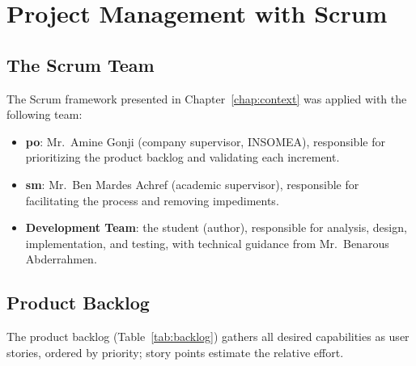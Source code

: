 \section{Project Management with Scrum}
\label{sec:scrum-management}

\subsection{The Scrum Team}
The Scrum framework presented in Chapter~\ref{chap:context} was applied with the
following team:
\begin{itemize}[leftmargin=1.4em]
  \item \textbf{\gls{po}}: Mr.\ Amine Gonji (company supervisor, INSOMEA),
        responsible for prioritizing the product backlog and validating each
        increment.
  \item \textbf{\gls{sm}}: Mr.\ Ben Mardes Achref (academic supervisor),
        responsible for facilitating the process and removing impediments.
  \item \textbf{Development Team}: the student (author), responsible for analysis,
        design, implementation, and testing, with technical guidance from
        Mr.\ Benarous Abderrahmen.
\end{itemize}

\subsection{Product Backlog}
\label{sec:backlog}
The product backlog (Table~\ref{tab:backlog}) gathers all desired capabilities as
user stories, ordered by priority; story points estimate the relative effort.

